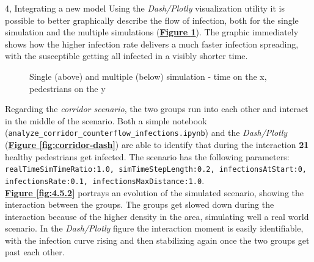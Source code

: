 \documentclass[10pt,a4paper]{article}
\begin{document}
\begin{task}{4, Integrating a new model}
Using the \textit{Dash/Plotly} visualization utility it is possible to better graphically describe the flow of infection, both for the single simulation and the multiple simulations (\textbf{\hyperref[fig:dash-4.5.1]{Figure \ref{fig:dash-4.5.1}}}). The graphic immediately shows how the higher infection rate delivers a much faster infection spreading, with the susceptible getting all infected in a visibly shorter time.

\begin{figure}[!h]
  \centering
  \vspace{1cm}
\caption{Single (above) and multiple (below) simulation - time on the x, pedestrians on the y}
\label{fig:dash-4.5.1}
\end{figure}

\pagebreak
Regarding the \textit{corridor scenario}, the two groups run into each other and interact in the middle of the scenario. Both a simple notebook (\texttt{analyze\_corridor\_counterflow\_infections.ipynb}) and the \textit{Dash/Plotly} (\textbf{\hyperref[fig:corridor-dash]{Figure \ref{fig:corridor-dash}}}) are able to identify that during the interaction \textbf{21} healthy pedestrians get infected. The scenario has the following parameters: \texttt{realTimeSimTimeRatio:1.0, simTimeStepLength:0.2, infectionsAtStart:0, infectionsRate:0.1, infectionsMaxDistance:1.0}.\\
\textbf{\hyperref[fig:4.5.2]{Figure \ref{fig:4.5.2}}} portrays an evolution of the simulated scenario, showing the interaction between the groups. The groups get slowed down during the interaction because of the higher density in the area, simulating well a real world scenario. In the \textit{Dash/Plotly} figure the interaction moment is easily identifiable, with the infection curve rising and then stabilizing again once the two groups get past each other.


\end{task}
\end{document}
